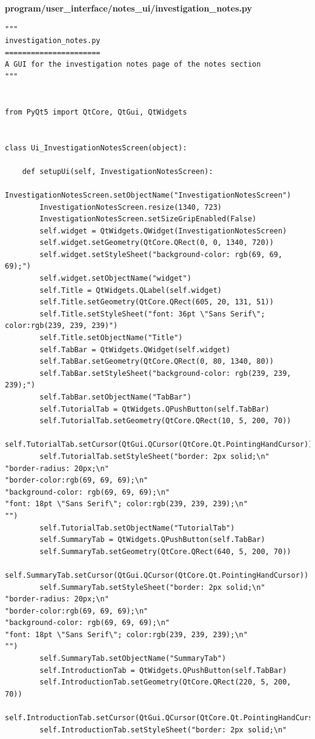 \documentclass[12pt]{article}
\begin{document}
\textbf{program/user\_interface/notes\_ui/investigation\_notes.py}
\begin{lstlisting}
"""
investigation_notes.py
======================
A GUI for the investigation notes page of the notes section
"""


from PyQt5 import QtCore, QtGui, QtWidgets


class Ui_InvestigationNotesScreen(object):

    def setupUi(self, InvestigationNotesScreen):
        InvestigationNotesScreen.setObjectName("InvestigationNotesScreen")
        InvestigationNotesScreen.resize(1340, 723)
        InvestigationNotesScreen.setSizeGripEnabled(False)
        self.widget = QtWidgets.QWidget(InvestigationNotesScreen)
        self.widget.setGeometry(QtCore.QRect(0, 0, 1340, 720))
        self.widget.setStyleSheet("background-color: rgb(69, 69, 69);")
        self.widget.setObjectName("widget")
        self.Title = QtWidgets.QLabel(self.widget)
        self.Title.setGeometry(QtCore.QRect(605, 20, 131, 51))
        self.Title.setStyleSheet("font: 36pt \"Sans Serif\"; color:rgb(239, 239, 239)")
        self.Title.setObjectName("Title")
        self.TabBar = QtWidgets.QWidget(self.widget)
        self.TabBar.setGeometry(QtCore.QRect(0, 80, 1340, 80))
        self.TabBar.setStyleSheet("background-color: rgb(239, 239, 239);")
        self.TabBar.setObjectName("TabBar")
        self.TutorialTab = QtWidgets.QPushButton(self.TabBar)
        self.TutorialTab.setGeometry(QtCore.QRect(10, 5, 200, 70))
        self.TutorialTab.setCursor(QtGui.QCursor(QtCore.Qt.PointingHandCursor))
        self.TutorialTab.setStyleSheet("border: 2px solid;\n"
"border-radius: 20px;\n"
"border-color:rgb(69, 69, 69);\n"
"background-color: rgb(69, 69, 69);\n"
"font: 18pt \"Sans Serif\"; color:rgb(239, 239, 239);\n"
"")
        self.TutorialTab.setObjectName("TutorialTab")
        self.SummaryTab = QtWidgets.QPushButton(self.TabBar)
        self.SummaryTab.setGeometry(QtCore.QRect(640, 5, 200, 70))
        self.SummaryTab.setCursor(QtGui.QCursor(QtCore.Qt.PointingHandCursor))
        self.SummaryTab.setStyleSheet("border: 2px solid;\n"
"border-radius: 20px;\n"
"border-color:rgb(69, 69, 69);\n"
"background-color: rgb(69, 69, 69);\n"
"font: 18pt \"Sans Serif\"; color:rgb(239, 239, 239);\n"
"")
        self.SummaryTab.setObjectName("SummaryTab")
        self.IntroductionTab = QtWidgets.QPushButton(self.TabBar)
        self.IntroductionTab.setGeometry(QtCore.QRect(220, 5, 200, 70))
        self.IntroductionTab.setCursor(QtGui.QCursor(QtCore.Qt.PointingHandCursor))
        self.IntroductionTab.setStyleSheet("border: 2px solid;\n"

\end{lstlisting}
\end{document}
